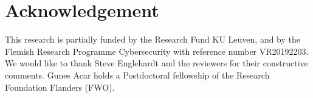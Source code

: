 \section{Acknowledgement}
\label{sec:acknowledgements}

This research is partially funded by the Research Fund KU Leuven, and by the Flemish Research Programme Cybersecurity with reference number VR20192203. We would like to thank Steve Englehardt and the reviewers for their constructive comments. Gunes Acar holds a Postdoctoral fellowship of the Research Foundation Flanders (FWO).